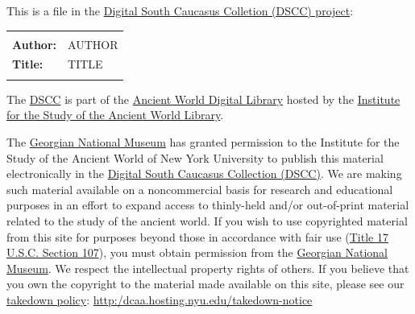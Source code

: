 \documentclass[final, 12pt]{report}
\newcounter{nopage}
\newenvironment{nopage}
	{\clearpage\stepcounter{nopage}%
		\renewcommand{\thepage}{}%
		\thispagestyle{empty}}
	{\clearpage\addtocounter{page}{0}}
\begin{document}
	\begin{nopage}

	This is a file in the 
	\href{http://dcaa.hosting.nyu.edu/}{Digital South Caucasus Colletion (DSCC) project}:\vspace{24pt}
	
	\begin{tabular}{lp{6in}}
		\hline
		\\
		\textbf{Author:}				&	{{AUTHOR}}		\\
		\textbf{Title:}				&	{{TITLE}}			\\
		\\
		\hline
	\end{tabular}
	
	\vspace{24pt}
	
	The 
	\href{http://dcaa.hosting.nyu.edu/dscc}{DSCC}
	is part of the 
	\href{http://dlib.nyu.edu/ancientworld/}{Ancient World Digital Library}
	hosted by the 
	\href{https://isaw.nyu.edu/library}{Institute for the Study of the Ancient World Library}.
	
	\vspace{24pt}
	
	The \href{https://www.aejm.org/members/georgian-national-museum/}{Georgian National Museum} has granted permission to the Institute for the Study of the Ancient World of New York University to publish this material electronically in the \href{http://dcaa.hosting.nyu.edu/dscc/}{Digital South Caucasus Collection (DSCC)}.	
	We are making such material available on a noncommercial basis  for research and educational purposes
		in an effort to expand access to thinly-held and/or out-of-print  material related to the study of the ancient world.
	If you wish to use copyrighted material from this site  for purposes beyond those in accordance with fair use 
		(\href{https://www.copyright.gov/title17/92chap1.html}{Title 17 U.S.C. Section 107}),
		you must obtain permission from the 
		\href{https://www.aejm.org/members/georgian-national-museum/}{Georgian National Museum}. 
	We respect the intellectual property rights of others.
	If you believe that you own the copyright to the material made available on this site, 
		please see our \href{http:/dcaa.hosting.nyu.edu/takedown-notice}{takedown policy}: 
		\href{http:/dcaa.hosting.nyu.edu/takedown-notice}{http:/dcaa.hosting.nyu.edu/takedown-notice}


\end{nopage}
\end{document}
